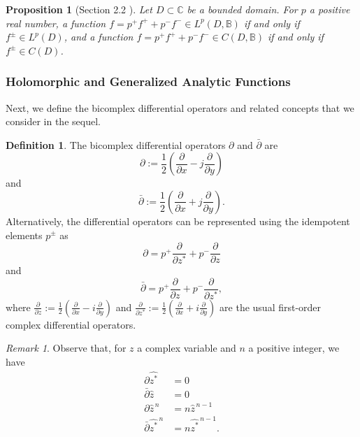 \documentclass[12pt,reqno]{amsart}
\newtheorem{prop}[theorem]{Proposition}
\theoremstyle{definition}
\newtheorem{deff}[theorem]{Definition}
\theoremstyle{remark}
\newtheorem{comm}[theorem]{Remark}
\newcommand{\p}{\partial}
\newcommand{\dbar}{\bar\partial}
\newcommand{\bc}{\mathbb{B}}
\begin{document}
           

            \begin{prop}[Section 2.2 \cite{BCBergman}]\label{cor: corollaryof2.24BCAtomic}\label{prop: bcctsiffidemc}
                Let $D \subset \mathbb{C}$ be a bounded domain. For $p$ a positive real number, a function $f = p^+ f^+ + p^- f^- \in L^p(D, \bc)$ if and only if $f^\pm \in L^p(D)$, and a function $f = p^+ f^+ + p^- f^- \in C(D, \bc)$ if and only if $f^\pm \in C(D)$.
            \end{prop}

            



         \subsubsection{Holomorphic and Generalized Analytic Functions}

            Next, we define the bicomplex differential operators and related concepts that we consider in the sequel. 

            \begin{deff}\label{bcdbardef}
                The bicomplex differential operators $\p$ and $\dbar$ are
                \[
                    \p := \frac{1}{2} \left( \frac{\p}{\p x} - j \frac{\p }{\p y}\right)
                \]
                and
                \[
                    \dbar := \frac{1}{2} \left( \frac{\p}{\p x} + j \frac{\p }{\p y}\right).
                \]
                Alternatively, the differential operators can be represented using the idempotent elements $p^\pm$ as 
                \[
                    \p = p^+ \frac{\p}{\p z^*} + p^- \frac{\p }{\p z}
                \]
                and
                \[
                    \dbar = p^+ \frac{\p }{\p z} + p^- \frac{\p}{\p z^*},
                \]
                where $\frac{\p}{\p z} := \frac{1}{2}\left(\frac{\p}{\p x} -i \frac{\p}{\p y}\right)$ and $\frac{\p}{\p z^*} := \frac{1}{2}\left(\frac{\p}{\p x} + i \frac{\p}{\p y}\right)$ are the usual first-order complex differential operators.
            \end{deff}

            \begin{comm}
                Observe that, for $z$ a complex variable and $n$ a positive integer, we have
                \begin{align*}
                    \p \widehat{z^*} &= 0 \\
                    \dbar \widehat{z} &=0 \\
                    \p \widehat{z}^{\,n} &= n \widehat{z}^{\,n-1}\\
                    \dbar \widehat{z^*}^{\,n} &= n \widehat{z^*}^{\,n-1}.
                \end{align*}
            \end{comm}
\end{document}
